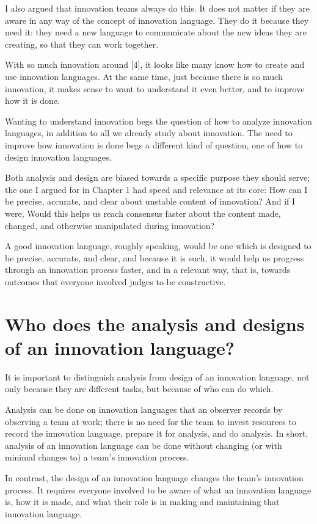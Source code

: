 I also argued that innovation teams always do this. It does not matter if they are aware in any way of the concept of innovation language. They do it because they need it: they need a new language to communicate about the new ideas they are creating, so that they can work together.

With so much innovation around [4], it looks like many know how to create and use innovation languages. At the same time, just because there is so much innovation, it makes sense to want to understand it even better, and to improve how it is done. 

Wanting to understand innovation begs the question of how to analyze innovation languages, in addition to all we already study about innovation. The need to improve how innovation is done begs a different kind of question, one of how to design innovation languages.

Both analysis and design are biased towards a specific purpose they should serve; the one I argued for in Chapter 1 had speed and relevance at its core: How can I be precise, accurate, and clear about unstable content of innovation? And if I were, Would this helps us reach consensus faster about the content made, changed, and otherwise manipulated during innovation?

A good innovation language, roughly speaking, would be one which is designed to be precise, accurate, and clear, and because it is such, it would help us progress through an innovation process faster, and in a relevant way, that is, towards outcomes that everyone involved judges to be constructive. 

\section{Who does the analysis and designs of an innovation language?}
\label{c2:s2}
It is important to distinguish analysis from design of an innovation language, not only because they are different tasks, but because of who can do which. 

Analysis can be done on innovation languages that an observer records by observing a team at work; there is no need for the team to invest resources to record the innovation language, prepare it for analysis, and do analysis. In short, analysis of an innovation language can be done without changing (or with minimal changes to) a team's innovation process. 

In contrast, the design of an innovation language changes the team's innovation process. It requires everyone involved to be aware of what an innovation language is, how it is made, and what their role is in making and maintaining that innovation language. 

